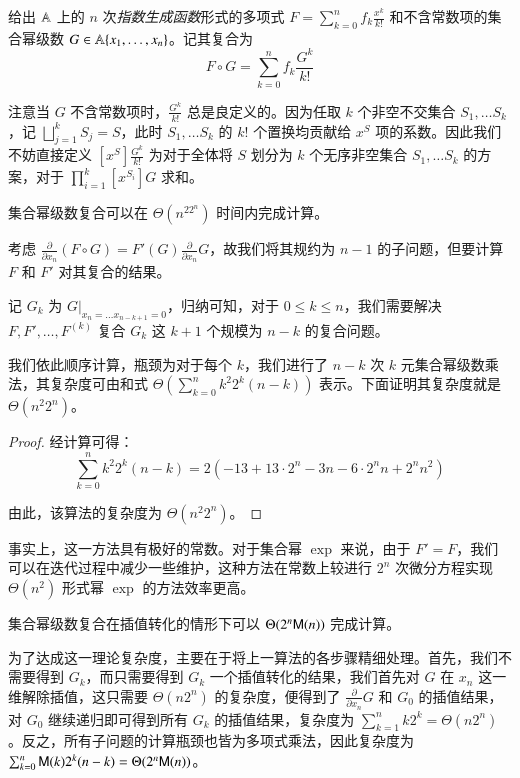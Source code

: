 \begin{definition} [集合幂级数复合]
给出 $\mathbb A$ 上的 $n$ 次\emph{指数生成函数}形式的多项式 $F = \sum_{k=0}^n f_k \frac{x^k}{k!}$ 和不含常数项的集合幂级数 $G \in \mathbb A\{x_1, \dots, x_n\}$。记其复合为
$$
F\circ G = \sum_{k=0}^n f_k\frac{G^k}{k!}
$$

注意当 $G$ 不含常数项时，$\frac{G^k}{k!}$ 总是良定义的。因为任取 $k$ 个非空不交集合 $S_1,\dots S_k$，记 $\bigsqcup_{j=1}^k S_j = S$，此时 $S_1,\dots S_k$ 的 $k!$ 个置换均贡献给 $x^S$ 项的系数。因此我们不妨直接定义 $[x^S]\frac{G^k}{k!}$ 为对于全体将 $S$ 划分为 $k$ 个无序非空集合 $S_1,\dots S_k$ 的方案，对于 $\prod_{i=1}^k [x^{S_i}]G$ 求和。
\end{definition}

\begin{theorem}
集合幂级数复合可以在 $\Theta(n^22^n)$ 时间内完成计算。
\end{theorem}

考虑 $\frac{\partial}{\partial x_n} (F \circ G) = F'(G)\frac{\partial}{\partial x_n} G$，故我们将其规约为 $n-1$ 的子问题，但要计算 $F$ 和 $F'$ 对其复合的结果。

记 $G_k$ 为 $\left. G \right |_{x_n = \dots x_{n-k+1}=0}$，归纳可知，对于 $0\le k\le n$，我们需要解决 $F, F', \dots, F^{(k)}$ 复合 $G_k$ 这 $k+1$ 个规模为 $n-k$ 的复合问题。

我们依此顺序计算，瓶颈为对于每个 $k$，我们进行了 $n-k$ 次 $k$ 元集合幂级数乘法，其复杂度可由和式 $\Theta \left(\sum_{k=0}^n k^2 2^k (n-k)\right)$ 表示。下面证明其复杂度就是 $\Theta(n^2 2^n)$。

\begin{proof}
经计算可得：
$$
\sum_{k=0}^n k^2 2^k (n-k) = 2(-13 + 13\cdot 2^n - 3n - 6\cdot 2^n n+ 2^n n^2)
$$

由此，该算法的复杂度为 $\Theta(n^2 2^n)$。
\end{proof}

事实上，这一方法具有极好的常数。对于集合幂 $\exp$ 来说，由于 $F'=F$，我们可以在迭代过程中减少一些维护，这种方法在常数上较进行 $2^n$ 次微分方程实现 $\Theta(n^2)$ 形式幂 $\exp$ 的方法效率更高。

\begin{lemma}
集合幂级数复合在插值转化的情形下可以 $\Theta(2^n\mathsf M(n))$ 完成计算。
\end{lemma}

为了达成这一理论复杂度，主要在于将上一算法的各步骤精细处理。首先，我们不需要得到 $G_k$，而只需要得到 $G_k$ 一个插值转化的结果，我们首先对 $G$ 在 $x_n$ 这一维解除插值，这只需要 $\Theta(n2^n)$ 的复杂度，便得到了 $\frac{\partial}{\partial x_n} G$ 和 $G_0$ 的插值结果，对 $G_0$ 继续递归即可得到所有 $G_k$ 的插值结果，复杂度为 $\sum_{k=1}^n k2^k = \Theta(n2^n)$。反之，所有子问题的计算瓶颈也皆为多项式乘法，因此复杂度为 $\sum_{k=0}^n \mathsf M(k) 2^k(n-k) = \Theta(2^n\mathsf M(n))$。

